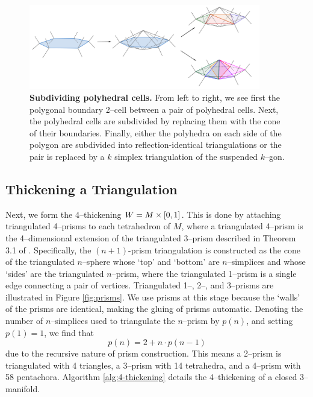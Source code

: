 \begin{figure}[h!]
	\centering
	\includegraphics[width=0.9\textwidth]{figures/subdivide-polyhedra.png}
	\caption{
		\textbf{Subdividing polyhedral cells.}
		From left to right, we see first the polygonal boundary 2--cell between a pair of polyhedral cells.
		Next, the polyhedral cells are subdivided by replacing them with the cone of their boundaries.
		Finally, either the polyhedra on each side of the polygon are subdivided into reflection-identical triangulations or the pair is replaced by a $k$ simplex triangulation  of the suspended $k$--gon.
	}
	\label{fig:subdivide-polyhedra}
\end{figure}

\subsection{Thickening a Triangulation}

Next, we form the 4--thickening $W=M\times[0,1]$.
This is done by attaching triangulated 4--prisms to each tetrahedron of $M$, where a triangulated 4--prism is the 4--dimensional extension of the triangulated 3--prism described in Theorem 3.1 of \cite{burton2011simplification}.
Specifically, the $(n+1)$-prism triangulation is constructed as the cone of the triangulated $n$--sphere whose `top' and `bottom' are $n$--simplices and whose `sides' are the triangulated $n$--prism, where the triangulated 1--prism is a single edge connecting a pair of vertices.
Triangulated 1--, 2--, and 3--prisms are illustrated in Figure \ref{fig:prisms}.
We use prisms at this stage because the `walls' of the prisms are identical, making the gluing of prisms automatic.
Denoting the number of $n$--simplices used to triangulate the $n$--prism by $p(n)$, and setting $p(1)=1$, we find that
\[
	p(n) = 2 + n\cdot p(n-1)
\]
due to the recursive nature of prism construction.
This means a 2--prism is triangulated with 4 triangles, a 3--prism with 14 tetrahedra, and a 4--prism with 58 pentachora.
Algorithm \ref{alg:4-thickening} details the 4--thickening of a closed 3--manifold.

